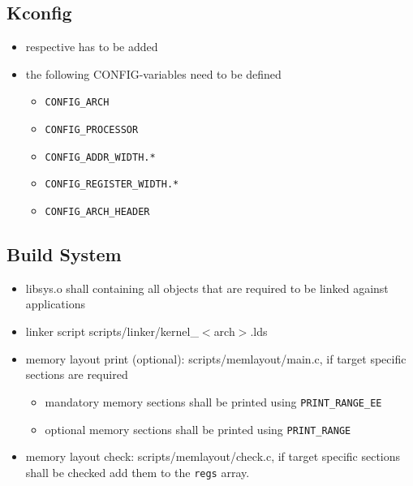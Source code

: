 	\subsection{Kconfig}
		\begin{itemize}
			\item respective  has to be added
			\item the following CONFIG-variables need to be defined
				\begin{itemize}
					\item \lstinline{CONFIG_ARCH}
					\item \lstinline{CONFIG_PROCESSOR}
					\item \lstinline{CONFIG_ADDR_WIDTH.*}
					\item \lstinline{CONFIG_REGISTER_WIDTH.*}
					\item \lstinline{CONFIG_ARCH_HEADER}
				\end{itemize}
		\end{itemize}

	\subsection{Build System}
		\begin{itemize}
			\item libsys.o shall containing all objects that are required to be linked against applications
			\item linker script scripts/linker/kernel\_$<$arch$>$.lds
			\item memory layout print (optional): scripts/memlayout/main.c, if target specific sections are required
				\begin{itemize}
					\item mandatory memory sections shall be printed using \lstinline{PRINT_RANGE_EE}
					\item optional memory sections shall be printed using \lstinline{PRINT_RANGE}
				\end{itemize}

			\item memory layout check: scripts/memlayout/check.c, if target specific sections shall be checked add them to the \lstinline{regs} array.
		\end{itemize}

\vfill
\pagebreak

